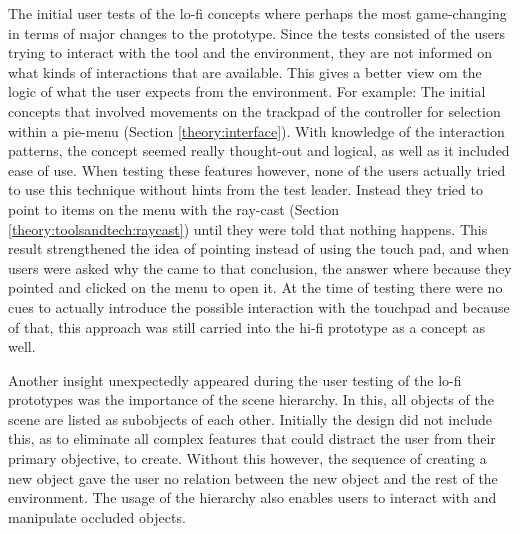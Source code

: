The initial user tests of the lo-fi concepts where perhaps the most game-changing in terms of major changes to the prototype. Since the tests consisted of the users trying to interact with the tool and the environment, they are not informed on what kinds of interactions that are available. This gives a better view om the logic of what the user expects from the environment. For example: The initial concepts that involved movements on the trackpad of the controller for selection within a pie-menu (Section \ref{theory:interface}). With knowledge of the interaction patterns, the concept seemed really thought-out and logical, as well as it included ease of use. When testing these features however, none of the users actually tried to use this technique without hints from the test leader. Instead they tried to point to items on the menu with the ray-cast (Section \ref{theory:toolsandtech:raycast}) until they were told that nothing happens. This result strengthened the idea of pointing instead of using the touch pad, and when users were asked why the came to that conclusion, the answer where because they pointed and clicked on the menu to open it. At the time of testing there were no cues to actually introduce the possible interaction with the touchpad and because of that, this approach was still carried into the hi-fi prototype as a concept as well.

Another insight unexpectedly appeared during the user testing of the lo-fi prototypes was the importance of the scene hierarchy. In this, all objects of the scene are listed as subobjects of each other. Initially the design did not include this, as to eliminate all complex features that could distract the user from their primary objective, to create. Without this however, the sequence of creating a new object gave the user no relation between the new object and the rest of the environment. The usage of the hierarchy also enables users to interact with and manipulate occluded objects.


